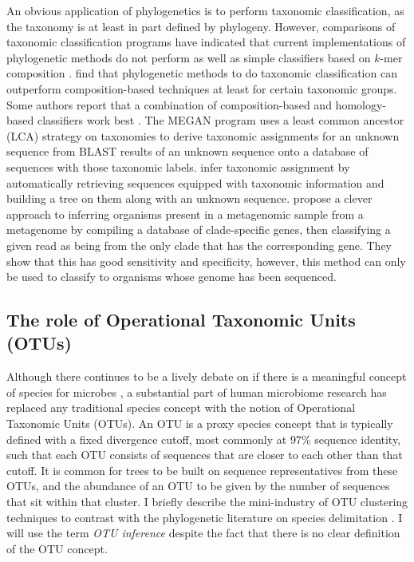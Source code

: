 \documentclass{amsart}
\begin{document}
An obvious application of phylogenetics is to perform taxonomic classification, as the taxonomy is at least in part defined by phylogeny.
However, comparisons of taxonomic classification programs \citep{liu2008accurate,bazinet2012comparative} have indicated that current implementations of phylogenetic methods do not perform as well as simple classifiers based on $k$-mer composition \citep{wang2007naive,rosen2008metagenome}.
\citet{srinivasan2012bacterial} find that phylogenetic methods to do taxonomic classification can outperform composition-based techniques at least for certain taxonomic groups.
Some authors report that a combination of composition-based and homology-based classifiers work best \citep{brady2009phymm,parks2011classifying}.
The MEGAN program \citep{huson2007megan,huson2011integrative} uses a least common ancestor (LCA) strategy on taxonomies to derive taxonomic assignments for an unknown sequence from BLAST results of an unknown sequence onto a database of sequences with those taxonomic labels.
\citet{munch2008statistical,munch2008fast} infer taxonomic assignment by automatically retrieving sequences equipped with taxonomic information and building a tree on them along with an unknown sequence.
\citet{segata2012metagenomic} propose a clever approach to inferring organisms present in a metagenomic sample from a metagenome by compiling a database of clade-specific genes, then classifying a given read as being from the only clade that has the corresponding gene.
They show that this has good sensitivity and specificity, however, this method can only be used to classify to organisms whose genome has been sequenced.

\subsection{The role of Operational Taxonomic Units (OTUs)}
Although there continues to be a lively debate on if there is a meaningful concept of species for microbes \citep{bapteste2009prokaryotic,caro2012bacterial}, a substantial part of human microbiome research has replaced any traditional species concept with the notion of Operational Taxonomic Units (OTUs).
An OTU is a proxy species concept that is typically defined with a fixed divergence cutoff, most commonly at 97\% sequence identity, such that each OTU consists of sequences that are closer to each other than that cutoff.
It is common for trees to be built on sequence representatives from these OTUs, and the abundance of an OTU to be given by the number of sequences that sit within that cluster.
I briefly describe the mini-industry of OTU clustering techniques to contrast with the phylogenetic literature on species delimitation \citep{pons2006sequence,yang2010bayesian}.
I will use the term \emph{OTU inference} despite the fact that there is no clear definition of the OTU concept.
\end{document}
